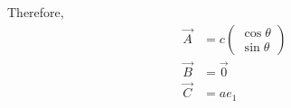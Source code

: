 \documentclass[12pt]{article}
\begin{document}
Therefore,
\begin{align}
    \Vec{A}&=c\begin{pmatrix}
        \cos{\theta}\\\sin{\theta}
    \end{pmatrix}\\
    \Vec{B}&=\Vec{0}\\
    \Vec{C}&=ae_1
\end{align}
\end{document}
